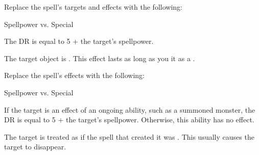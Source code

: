 


Replace the spell's targets and effects with the following:
\begin{spellcontent}

\begin{augmenttargetinginfo}




\end{augmenttargetinginfo}


\begin{augmenteffects}




\begin{spellattack}{Spellpower vs. Special}


\spellspecial
The DR is equal to 5 + the target's spellpower.



\spellsuccess
The target object is .
This effect lasts as long as you  it as a .



\end{spellattack}





\end{augmenteffects}

\end{spellcontent}








Replace the spell's effects with the following:
\begin{spellcontent}

\begin{augmenteffects}




\begin{spellattack}{Spellpower vs. Special}


\spellspecial
If the target is an effect of an ongoing  ability, such as a summoned monster, the DR is equal to 5 + the target's spellpower.
Otherwise, this ability has no effect.



\spellsuccess
The target is treated as if the spell that created it was .
This usually causes the target to disappear.



\end{spellattack}





\end{augmenteffects}

\end{spellcontent}





